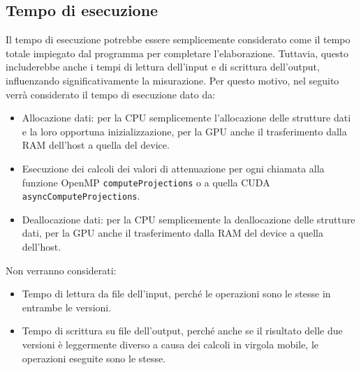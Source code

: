\documentclass[12pt,a4paper]{report}
\begin{document}
\subsection{Tempo di esecuzione}

Il tempo di esecuzione potrebbe essere semplicemente considerato come il tempo totale impiegato dal programma per completare
l'elaborazione.
Tuttavia, questo includerebbe anche i tempi di lettura dell'input e di scrittura dell'output, influenzando significativamente la
misurazione.
Per questo motivo, nel seguito verrà considerato il tempo di esecuzione dato da:
\begin{itemize}
  \item Allocazione dati: per la CPU semplicemente l'allocazione delle strutture dati e la loro opportuna inizializzazione, per la
        GPU anche il trasferimento dalla RAM dell'host a quella del device.
  \item Esecuzione dei calcoli dei valori di attenuazione per ogni chiamata alla funzione OpenMP \lstinline{computeProjections} o
        a quella CUDA \mbox{\lstinline{asyncComputeProjections}.}
  \item Deallocazione dati: per la CPU semplicemente la deallocazione delle strutture dati, per la GPU anche il trasferimento
        dalla RAM del device a quella dell'host.
\end{itemize}
Non verranno considerati:
\begin{itemize}
  \item Tempo di lettura da file dell'input, perché le operazioni sono le stesse in entrambe le versioni.
  \item Tempo di scrittura su file dell'output, perché anche se il risultato delle due versioni è leggermente diverso a causa dei
        calcoli in virgola mobile, le operazioni eseguite sono le stesse.
\end{itemize}
\end{document}
